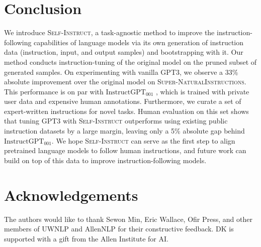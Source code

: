 \documentclass[11pt]{article}
\newcommand{\name}{\textsc{Self-Instruct}}
\newcommand{\supernat}{\textsc{Super-NaturalInstructions}}
\newcommand{\gptthree}{\textsc{GPT3}}
\newcommand{\gptinstruct}[1]{$\text{InstructGPT}_{\text{#1}}$}
\begin{document}


\section{Conclusion}
We introduce \name{}, a task-agnostic method to improve the instruction-following capabilities of language models via its own generation of instruction data (instruction, input, and output samples) and bootstrapping with it. Our method conducts instruction-tuning of the original model on the pruned subset of generated samples. On experimenting with vanilla \gptthree{}, we observe a 33\% absolute improvement over the original model on \supernat{}. This performance is on par with \gptinstruct{001}
, which is trained with private user data and expensive human annotations. Furthermore, we curate a set of expert-written instructions for novel tasks. Human evaluation on this set shows that tuning GPT3 with \name{} outperforms using existing public instruction datasets by a large margin, leaving only a 5\% absolute gap behind \gptinstruct{001}. We hope \name{} can serve as the first step to align pretrained language models to follow human instructions, and future work can build on top of this data to improve instruction-following models.

\section*{Acknowledgements}
The authors would like to thank Sewon Min, Eric Wallace, Ofir Press, and other members of UWNLP and AllenNLP for their constructive feedback. 
DK is supported with a gift from the Allen Institute for AI. 
\end{document}
